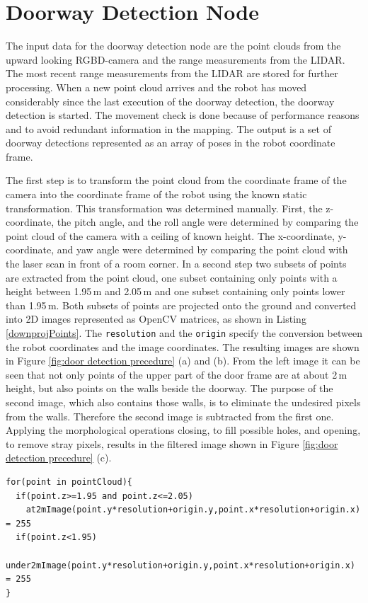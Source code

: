\section{Doorway Detection Node} \label{doorway_impl}

The input data for the doorway detection node are the point clouds from the upward looking RGBD-camera and the range measurements from the LIDAR. The most recent range measurements from the LIDAR are stored for further processing. When a new point cloud arrives and the robot has moved considerably since the last execution of the doorway detection, the doorway detection is started. The movement check is done because of performance reasons and to avoid redundant information in the mapping. The output is a set of doorway detections represented as an array of poses in the robot coordinate frame.

The first step is to transform the point cloud from the coordinate frame of the camera into the coordinate frame of the robot using the known static transformation. This transformation was determined manually. First, the z-coordinate, the pitch angle, and the roll angle were determined by comparing the point cloud of the camera with a ceiling of known height. The x-coordinate, y-coordinate, and yaw angle were determined by comparing the point cloud with the laser scan in front of a room corner. In a second step two subsets of points are extracted from the point cloud, one subset containing only points with a height between 1.95\,m and 2.05\,m and one subset containing only points lower than 1.95\,m. Both subsets of points are projected onto the ground and converted into 2D images represented as OpenCV matrices, as shown in Listing \ref{downprojPoints}. The \texttt{resolution} and the \texttt{origin} specify the conversion between the robot coordinates and the image coordinates. The resulting images are shown in Figure \ref{fig:door detection precedure} (a) and (b). From the left image it can be seen that not only points of the upper part of the door frame are at about 2\,m height, but also points on the walls beside the doorway. The purpose of the second image, which also contains those walls, is to eliminate the undesired pixels from the walls. Therefore the second image is subtracted from the first one. Applying the morphological operations closing, to fill possible holes, and opening, to remove stray pixels, results in the filtered image shown in Figure \ref{fig:door detection precedure} (c).

\begin{minipage}{\linewidth}
\begin{lstlisting}[caption=Projection of points into corresponding image,frame=single, label=downprojPoints]
for(point in pointCloud){
  if(point.z>=1.95 and point.z<=2.05)
    at2mImage(point.y*resolution+origin.y,point.x*resolution+origin.x) = 255
  if(point.z<1.95)
    under2mImage(point.y*resolution+origin.y,point.x*resolution+origin.x) = 255
}
\end{lstlisting}
\end{minipage} 

